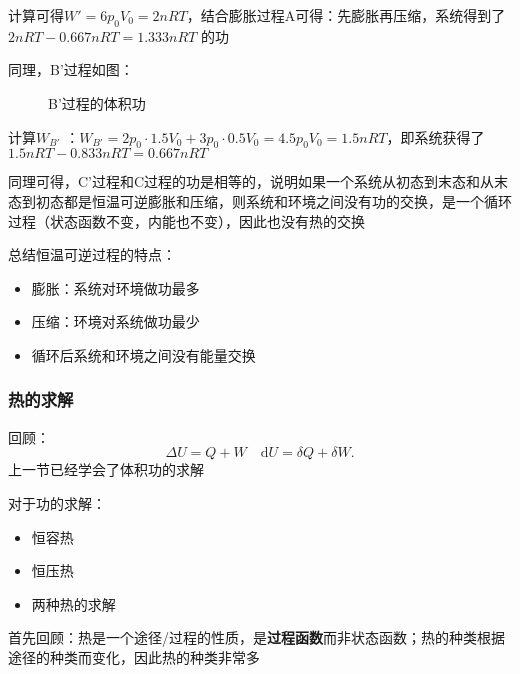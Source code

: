 计算可得$W' = 6p_0V_0 = 2nRT $，结合膨胀过程A可得：先膨胀再压缩，系统得到了$2nRT -0.667nRT = 1.333nRT $ 的功

同理，B'过程如图：
\begin{figure}[ht]
    \centering
    \caption{B'过程的体积功}
    \label{fig:b'过程的体积功}
\end{figure}

计算$W_{B'}$ ：$W_{B'} = 2p_0\cdot 1.5V_0+3p_0\cdot 0.5V_0 = 4.5p_0V_0 = 1.5nRT $，即系统获得了$1.5nRT -0.833nRT =0.667nRT $

同理可得，C'过程和C过程的功是相等的，说明如果一个系统从初态到末态和从末态到初态都是恒温可逆膨胀和压缩，则系统和环境之间没有功的交换，是一个循环过程（状态函数不变，内能也不变），因此也没有热的交换

总结恒温可逆过程的特点：
\begin{itemize}
    \item 膨胀：系统对环境做功最多
    \item 压缩：环境对系统做功最少
    \item 循环后系统和环境之间没有能量交换
\end{itemize}
\subsubsection*{热的求解}%
\label{subsub:热的求解}
回顾：\[
    \Delta U = Q+W\quad \mathrm{d}U = \delta Q + \delta W
.\]
上一节已经学会了体积功的求解

对于功的求解：
\begin{itemize}
    \item 恒容热
    \item 恒压热
    \item 两种热的求解
\end{itemize}
首先回顾：热是一个途径/过程的性质，是\textbf{过程函数}而非状态函数；热的种类根据途径的种类而变化，因此热的种类非常多

